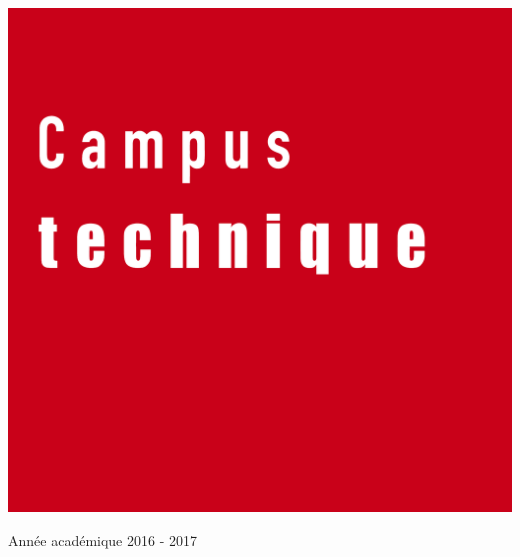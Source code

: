 \begin{center}
  \vspace{1cm}

  \includegraphics[scale=0.08]{textures/logo/technical.pdf}

  \vspace{0.5cm}

  Année académique 2016 - 2017
\end{center}

\thispagestyle{empty}
